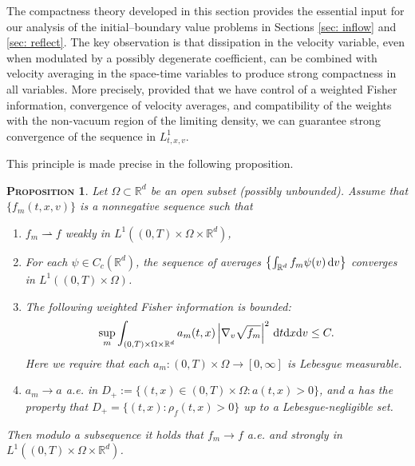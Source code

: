 \documentclass[10pt, reqno]{amsart}
\theoremstyle{plain}
\newtheorem{proposition}[theorem]{\normalfont \scshape Proposition}
\theoremstyle{definition}
\theoremstyle{remark}
\numberwithin{equation}{section}
\newcommand{\R}{\mathbb{R}}
\newcommand{\dx}{\textnormal{d}x}
\newcommand{\dv}{\textnormal{d}v}
\newcommand{\dt}{\textnormal{d}t}
\newcommand{\weakto}{\rightharpoonup}
\newcommand{\lt}{\left}
\newcommand{\rt}{\right}
\begin{document}
The compactness theory developed in this section provides the essential input for
our analysis of the initial--boundary value problems in Sections \ref{sec: inflow}
and \ref{sec: reflect}. The key observation is that dissipation in the velocity variable, even when modulated by a possibly degenerate coefficient, can be combined with velocity averaging in the space-time variables to produce strong compactness in all variables. More precisely, provided that we have control of a weighted Fisher information, convergence of velocity averages, and compatibility of the weights with the non-vacuum region of the limiting density, we can guarantee strong convergence of the sequence in $L^1_{t,x,v}$.

This principle is made precise in the following proposition.

\begin{proposition} \label{prop: weighted fisher}
    Let $\Omega\subset\R^d$ be an open subset (possibly unbounded). Assume that $\{f_m(t,x,v)\}$ is a nonnegative sequence such that
    \begin{enumerate}[(P1)]
        \item $f_m \weakto f$ weakly in $L^1((0,T)\times\Omega\times\R^d)$,
        \item For each $\psi \in C_c(\R^d)$, the sequence of averages $\left\{ \int_{\R^d} f_m \psi(v)\,\dv \right\}$ converges in $L^1((0,T)\times\Omega)$.
        \item The following weighted Fisher information is bounded:
        \begin{align*}
            \sup_m \int_{(0,T)\times\Omega\times\R^d} a_m(t,x) \lt|\nabla_v \sqrt{f_m} \rt|^2 \,\dt\dx\dv \le C.
        \end{align*}
        Here we require that each $a_m:(0,T)\times\Omega\to [0,\infty]$ is Lebesgue measurable.
        \item $a_m\to a$ a.e. in $D_+ := \{(t,x)\in (0,T)\times\Omega :a(t,x)>0\}$, and $a$ has the property that $D_+ = \{(t,x): \rho_f(t,x) > 0\}$ up to a Lebesgue-negligible set.
    \end{enumerate}
    Then modulo a subsequence it holds that $f_m \to f$ a.e. and strongly in $L^1((0,T)\times\Omega\times\R^d)$.
\end{proposition}
\end{document}
